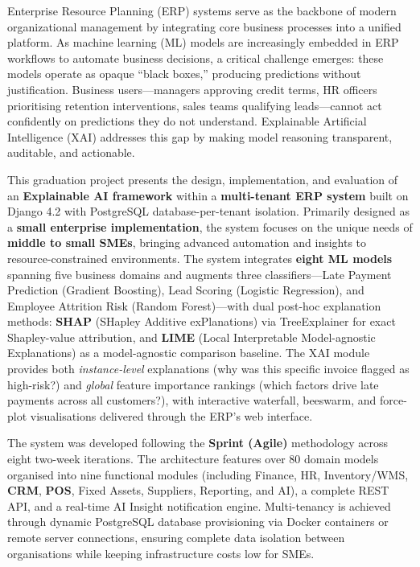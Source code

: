 \documentclass[12pt,a4paper]{report}
\begin{document}
Enterprise Resource Planning (ERP) systems serve as the backbone of modern organizational management by integrating core business processes into a unified platform. As machine learning (ML) models are increasingly embedded in ERP workflows to automate business decisions, a critical challenge emerges: these models operate as opaque ``black boxes,'' producing predictions without justification. Business users---managers approving credit terms, HR officers prioritising retention interventions, sales teams qualifying leads---cannot act confidently on predictions they do not understand. Explainable Artificial Intelligence (XAI) addresses this gap by making model reasoning transparent, auditable, and actionable.

This graduation project presents the design, implementation, and evaluation of an \textbf{Explainable AI framework} within a \textbf{multi-tenant ERP system} built on Django 4.2 with PostgreSQL database-per-tenant isolation. Primarily designed as a \textbf{small enterprise implementation}, the system focuses on the unique needs of \textbf{middle to small SMEs}, bringing advanced automation and insights to resource-constrained environments. The system integrates \textbf{eight ML models} spanning five business domains and augments three classifiers---Late Payment Prediction (Gradient Boosting), Lead Scoring (Logistic Regression), and Employee Attrition Risk (Random Forest)---with dual post-hoc explanation methods: \textbf{SHAP} (SHapley Additive exPlanations) via TreeExplainer for exact Shapley-value attribution, and \textbf{LIME} (Local Interpretable Model-agnostic Explanations) as a model-agnostic comparison baseline. The XAI module provides both \textit{instance-level} explanations (why was this specific invoice flagged as high-risk?) and \textit{global} feature importance rankings (which factors drive late payments across all customers?), with interactive waterfall, beeswarm, and force-plot visualisations delivered through the ERP's web interface.

The system was developed following the \textbf{Sprint (Agile)} methodology across eight two-week iterations. The architecture features over 80 domain models organised into nine functional modules (including Finance, HR, Inventory/WMS, \textbf{CRM}, \textbf{POS}, Fixed Assets, Suppliers, Reporting, and AI), a complete REST API, and a real-time AI Insight notification engine. Multi-tenancy is achieved through dynamic PostgreSQL database provisioning via Docker containers or remote server connections, ensuring complete data isolation between organisations while keeping infrastructure costs low for SMEs.
\end{document}
